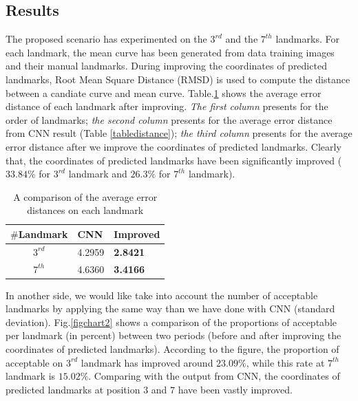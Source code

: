 \documentclass[10pt]{article}
\begin{document}
\subsection{Results}
The proposed scenario has experimented on the $3^{rd}$ and the $7^{th}$ landmarks. For each landmark, the mean curve has been generated from data training images and their manual landmarks. During improving the coordinates of predicted landmarks, Root Mean Square Distance (RMSD) is used to compute the distance between a candiate curve and mean curve. 
Table.\ref{tabledistance2} shows the average error distance of each landmark after improving. \textit{The first column} presents for the order of landmarks; \textit{the second column} presents for the average error distance from CNN result (Table \ref{tabledistance}); \textit{the third column} presents for the average error distance after we improve the coordinates of predicted landmarks. Clearly that, the coordinates of predicted landmarks have been significantly improved ( $33.84\%$ for $3^{rd}$ landmark and $26.3\%$ for $7^{th}$ landmark).

\begin{table}[htbp]
\centering
\begin{tabular}{c|p{1.5cm}|p{1.5cm}}

\textbf{$\#$Landmark} & \textbf{CNN} & \textbf{Improved} \\ \hline
$3^{rd}$ & 4.2959 & \textbf{2.8421}  \\ \hline
$7^{th}$ & 4.6360 & \textbf{3.4166} \\ 
\end{tabular}
\caption{A comparison of the average error distances on each landmark }
\label{tabledistance2}
\end{table}

In another side, we would like take into account the number of acceptable landmarks by applying the same way than we have done with CNN (standard deviation). Fig.\ref{figchart2} shows a comparison of the proportions of acceptable per landmark (in percent) between two periods (before and after improving the coordinates of predicted landmarks). According to the figure, the proportion of acceptable on $3^{rd}$ landmark has improved around $23.09\%$, while this rate at $7^{th}$ landmark is $15.02\%$. Comparing with the output from CNN, the coordinates of predicted landmarks at position $3$ and $7$ have been vastly improved.
\end{document}

